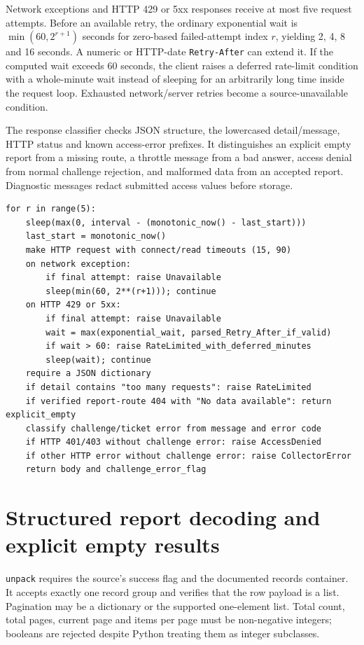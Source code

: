 \documentclass[12pt,a4paper,oneside]{report}
\numberwithin{equation}{chapter}
\numberwithin{figure}{chapter}
\numberwithin{table}{chapter}
\theoremstyle{definition}
\begin{document}
Network exceptions and HTTP 429 or 5xx responses receive at most five request attempts. Before an available retry, the ordinary exponential wait is $\min(60,2^{r+1})$ seconds for zero-based failed-attempt index $r$, yielding 2, 4, 8 and 16 seconds. A numeric or HTTP-date \texttt{Retry-After} can extend it. If the computed wait exceeds 60 seconds, the client raises a deferred rate-limit condition with a whole-minute wait instead of sleeping for an arbitrarily long time inside the request loop. Exhausted network/server retries become a source-unavailable condition.

The response classifier checks JSON structure, the lowercased detail/message, HTTP status and known access-error prefixes. It distinguishes an explicit empty report from a missing route, a throttle message from a bad answer, access denial from normal challenge rejection, and malformed data from an accepted report. Diagnostic messages redact submitted access values before storage.

\begin{lstlisting}[caption={Algorithm: paced HTTP attempts and error classification}]
for r in range(5):
    sleep(max(0, interval - (monotonic_now() - last_start)))
    last_start = monotonic_now()
    make HTTP request with connect/read timeouts (15, 90)
    on network exception:
        if final attempt: raise Unavailable
        sleep(min(60, 2**(r+1))); continue
    on HTTP 429 or 5xx:
        if final attempt: raise Unavailable
        wait = max(exponential_wait, parsed_Retry_After_if_valid)
        if wait > 60: raise RateLimited_with_deferred_minutes
        sleep(wait); continue
    require a JSON dictionary
    if detail contains "too many requests": raise RateLimited
    if verified report-route 404 with "No data available": return explicit_empty
    classify challenge/ticket error from message and error code
    if HTTP 401/403 without challenge error: raise AccessDenied
    if other HTTP error without challenge error: raise CollectorError
    return body and challenge_error_flag
\end{lstlisting}

\section{Structured report decoding and explicit empty results}
\texttt{unpack} requires the source's success flag and the documented records container. It accepts exactly one record group and verifies that the row payload is a list. Pagination may be a dictionary or the supported one-element list. Total count, total pages, current page and items per page must be non-negative integers; booleans are rejected despite Python treating them as integer subclasses.
\end{document}
